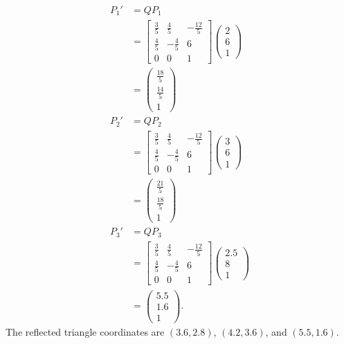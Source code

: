 \documentclass{zc-ust-hw}
\begin{document}
\begin{enumerate}
\begin{enumerate}
\begin{sol}
\begin{align}
            P_1' &= QP_1 \\
            &= \begin{bmatrix} 
                \frac{3}{5} & \frac{4}{5} & -\frac{12}{5} \\
                \frac{4}{5} & -\frac{4}{5} & 6 \\
                0 & 0 & 1
              \end{bmatrix} \begin{pmatrix} 2\\6\\1 \end{pmatrix} \\
              &= \begin{pmatrix}\frac{18}{5}\\\frac{14}{5}\\1\end{pmatrix} \\
            P_2' &= QP_2 \\
            &= \begin{bmatrix} 
                \frac{3}{5} & \frac{4}{5} & -\frac{12}{5} \\
                \frac{4}{5} & -\frac{4}{5} & 6 \\
                0 & 0 & 1
              \end{bmatrix} \begin{pmatrix} 3\\6\\1 \end{pmatrix} \\
              &= \begin{pmatrix} \frac{21}{5}\\\frac{18}{5}\\1 \end{pmatrix} \\
            P_3' &= QP_3 \\
            &= \begin{bmatrix} 
                \frac{3}{5} & \frac{4}{5} & -\frac{12}{5} \\
                \frac{4}{5} & -\frac{4}{5} & 6 \\
                0 & 0 & 1
              \end{bmatrix} \begin{pmatrix} 2.5\\8\\1 \end{pmatrix} \\
              &= \begin{pmatrix} 5.5\\1.6\\1 \end{pmatrix}
          .\end{align}
          The reflected triangle coordinates are $(3.6,2.8)$, $(4.2,3.6)$, and $(5.5,1.6)$.
        \end{sol}
    \end{enumerate}


\end{enumerate}
\end{document}
